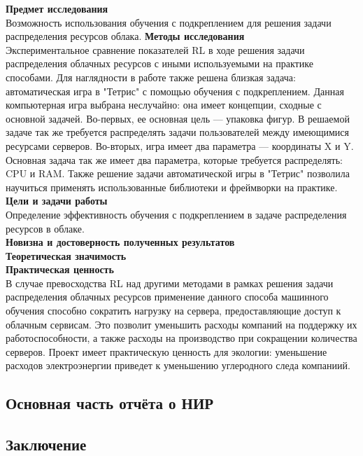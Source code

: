 \documentclass{article}
\begin{document}
\textbf{Предмет исследования}\\
Возможность использования обучения с подкреплением для решения задачи распределения ресурсов облака.
\textbf{Методы исследования}\\
Экспериментальное сравнение показателей RL в ходе решения задачи распределения облачных ресурсов с иными используемыми на практике способами. Для наглядности в работе также решена близкая задача: автоматическая игра в "Тетрис" с помощью обучения с подкреплением.  Данная компьютерная игра выбрана неслучайно: она имеет концепции, сходные с основной задачей. Во-первых, ее основная цель — упаковка фигур. В решаемой задаче так же требуется распределять задачи пользователей между имеющимися ресурсами серверов. Во-вторых, игра имеет два параметра — координаты X и Y. Основная задача так же имеет два параметра, которые требуется распределять: CPU и RAM. Также решение задачи автоматической игры в "Тетрис" позволила научиться применять использованные библиотеки и фреймворки на практике.\\
\textbf{Цели и задачи работы}\\
Определение эффективность обучения с подкреплением в задаче распределения ресурсов в облаке.\\
\textbf{Новизна и достоверность полученных результатов}\\
\textbf{Теоретическая значимость}\\
\textbf{Практическая ценность}\\
В случае превосходства RL над другими методами в рамках решения задачи распределения облачных ресурсов применение данного способа машинного обучения способно сократить нагрузку на сервера, предоставляющие доступ к облачным сервисам. Это позволит уменьшить расходы компаний на поддержку их работоспособности, а также расходы на производство при сокращении количества серверов. Проект имеет практическую ценность для экологии: уменьшение расходов электроэнергии приведет к уменьшению углеродного следа компаниий.	\\
\newpage
\begin{center}
\section {Основная часть отчёта о НИР}
\end{center}
\newpage
\begin{center}
\section {Заключение}
\end{center}
\end{document}

